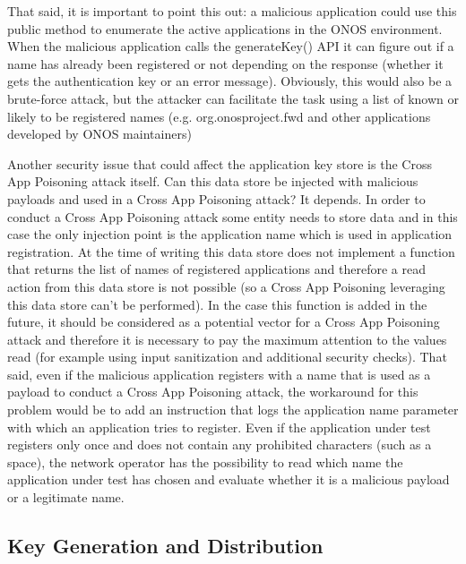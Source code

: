 That said, it is important to point this out: a malicious application could use this public method to enumerate the active applications in the ONOS environment. When the malicious application calls the generateKey() API it can figure out if a name has already been registered or not depending on the response (whether it gets the authentication key or an error message). Obviously, this would also be a brute-force attack, but the attacker can facilitate the task using a list of known or likely to be registered names (e.g. org.onosproject.fwd and other applications developed by ONOS maintainers)
\medskip

Another security issue that could affect the application key store is the Cross App Poisoning attack itself. Can this data store be injected with malicious payloads and used in a Cross App Poisoning attack? It depends. In order to conduct a Cross App Poisoning attack some entity needs to store data and in this case the only injection point is the application name which is used in application registration. At the time of writing this data store does not implement a function that returns the list of names of registered applications and therefore a read action from this data store is not possible (so a Cross App Poisoning leveraging this data store can't be performed). In the case this function is added in the future, it should be considered as a potential vector for a Cross App Poisoning attack and therefore it is necessary to pay the maximum attention to the values read (for example using input sanitization and additional security checks). That said, even if the malicious application registers with a name that is used as a payload to conduct a Cross App Poisoning attack, the workaround for this problem would be to add an instruction that logs the application name parameter with which an application tries to register. Even if the application under test registers only once and does not contain any prohibited characters (such as a space), the network operator has the possibility to read which name the application under test has chosen and evaluate whether it is a malicious payload or a legitimate name.

\subsection{Key Generation and Distribution}

